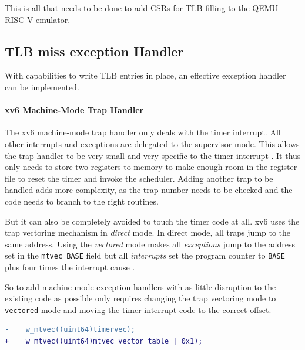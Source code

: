 This is all that needs to be done to add CSRs for TLB filling to the QEMU RISC-V emulator.




\subsection{TLB miss exception Handler}
With capabilities to write TLB entries in place, an effective exception handler can be implemented.

\paragraph{xv6 Machine-Mode Trap Handler} The xv6 machine-mode trap handler only deals
with the timer interrupt. All other interrupts and exceptions are delegated to the supervisor
mode. This allows the trap handler to be very small and very specific to the timer interrupt \cite{cox2011xv6}.
It thus only needs to store two registers to memory to make enough room in the register file
to reset the timer and invoke the scheduler.
Adding another trap to be handled adds more complexity, as the trap number needs to be checked
and the code needs to branch to the right routines.

But it can also be completely avoided to touch the timer code at all. xv6 uses the trap vectoring
mechanism in \textit{direct} mode. In direct mode, all traps jump to the same address.
Using the \textit{vectored} mode makes all \textit{exceptions} jump to the address set
in the \texttt{mtvec BASE} field but all \textit{interrupts} set the program counter
to \texttt{BASE} plus four times the interrupt cause \cite{RISCVInstructionSet}.

So to add machine mode exception handlers with as little disruption to the existing code as possible only
requires changing the trap vectoring mode to \texttt{vectored} mode and moving the timer interrupt code
to the correct offset.

\begin{lstlisting}[language=diff]
-    w_mtvec((uint64)timervec);
+    w_mtvec((uint64)mtvec_vector_table | 0x1);
\end{lstlisting}

